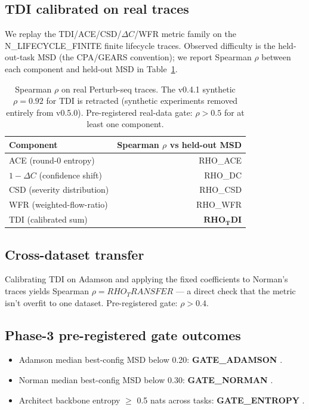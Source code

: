 \subsection{TDI calibrated on real traces}\label{sec:tdi-real}

We replay the TDI/ACE/CSD/$\Delta C$/WFR metric family on the
{{N_LIFECYCLE_FINITE}} finite lifecycle traces. Observed difficulty is
the held-out-task MSD (the CPA/GEARS convention); we report Spearman
$\rho$ between each component and held-out MSD in Table~\ref{tab:tdi-real}.

\begin{table}[h]
\small
\centering
\begin{tabular}{lr}
\toprule
Component & Spearman $\rho$ vs held-out MSD \\
\midrule
ACE (round-0 entropy)            & {{RHO_ACE}} \\
$1-\Delta C$ (confidence shift)  & {{RHO_DC}} \\
CSD (severity distribution)      & {{RHO_CSD}} \\
WFR (weighted-flow-ratio)        & {{RHO_WFR}} \\
TDI (calibrated sum)             & $\mathbf{ {{RHO_TDI}} }$ \\
\bottomrule
\end{tabular}
\caption{Spearman $\rho$ on real Perturb-seq traces. The v0.4.1 synthetic
$\rho\!=\!0.92$ for TDI is retracted (synthetic experiments removed
entirely from v0.5.0). Pre-registered real-data gate: $\rho\!>\!0.5$
for at least one component.}
\label{tab:tdi-real}
\end{table}

\subsection{Cross-dataset transfer}

Calibrating TDI on Adamson and applying the fixed coefficients to
Norman's traces yields Spearman $\rho\!=\!{{RHO_TRANSFER}}$ — a direct
check that the metric isn't overfit to one dataset. Pre-registered gate:
$\rho\!>\!0.4$.

\subsection{Phase-3 pre-registered gate outcomes}

\begin{itemize}
  \item Adamson median best-config MSD below 0.20:
  \textbf{ {{GATE_ADAMSON}} }.
  \item Norman median best-config MSD below 0.30:
  \textbf{ {{GATE_NORMAN}} }.
  \item Architect backbone entropy $\ge$ 0.5 nats across tasks:
  \textbf{ {{GATE_ENTROPY}} }.
\end{itemize}
